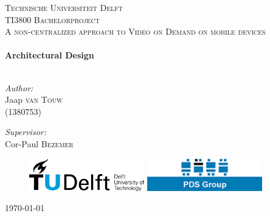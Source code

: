 \begin{titlepage}

\begin{center}



\textsc{\Large Technische Universiteit Delft }\\[1.5cm]
\textsc{\large TI3800 Bachelorproject}\\[0.5cm]
\textsc{\normalsize A non-centralized approach to Video on Demand on mobile devices}\\[0.5cm]


\HRule \\[0.4cm]
{ \huge \bfseries Architectural Design}\\[0.4cm]

\HRule \\[1.5cm]

\begin{minipage}{0.4\textwidth}
\begin{flushleft} \large
\emph{Author:}\\
Jaap \textsc{van Touw} \\(1380753)\\ [0.1cm]
\end{flushleft}
\end{minipage}
\begin{minipage}{0.4\textwidth}
\begin{flushright} \large
\emph{Supervisor:} \\
Cor-Paul \textsc{Bezemer}
\end{flushright}
\end{minipage}
\vspace{30mm}
\begin{figure}[ht!]
\centering
\includegraphics[width=50mm]{TUDLogo.png}
\hspace{10mm}
\includegraphics[width=50mm]{pdslogo.png}
\label{overflow}
\end{figure}
\vfill

{\large \today}

\end{center}

\end{titlepage}
